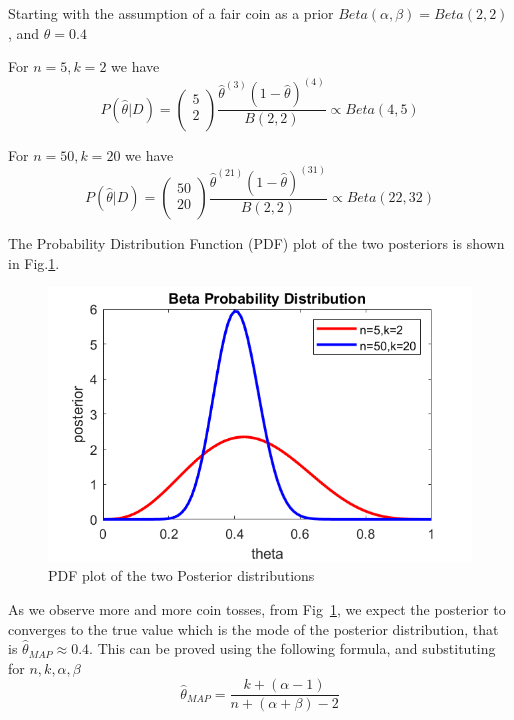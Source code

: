 \documentclass{article}
\begin{document}
\begin{enumerate}
\begin{enumerate}
{Starting with the assumption of a fair coin as a prior $Beta(\alpha, \beta) = Beta(2,2)$, and $\theta=0.4$

 For $n=5, k=2$ we have
\[
P(\hat{\theta}|D) =  \left(
                      \begin{array}{c}
                        5 \\
                        2 \\
                      \end{array}
                    \right)\frac{\hat{\theta}^{(3)}(1-\hat{\theta})^{(4)}}{B(2,2)} %
\propto Beta(4,5)
\]

 For $n=50, k=20$ we have
\[
P(\hat{\theta}|D) =   \left(
                      \begin{array}{c}
                        50 \\
                        20 \\
                      \end{array}
                    \right)\frac{\hat{\theta}^{(21)}(1-\hat{\theta})^{(31)}}{B(2,2)}  %
\propto Beta(22,32)
\]

The Probability Distribution Function (PDF) plot of the two posteriors is shown in Fig.\ref{betapdf_fig}.

\begin{figure}[!h]
  \centering
  \includegraphics[width=0.5\linewidth]{betapdfs.png}
  \caption{PDF plot of the two Posterior distributions}\label{betapdf_fig}
\end{figure}

As we observe more and more coin tosses, from Fig~\ref{betapdf_fig}, we expect the posterior to converges to the true value which is the mode of the posterior distribution, that is  $\hat{\theta}_{MAP} \approx 0.4$. This can be proved using the following formula, and substituting for $n,k, \alpha,\beta$
\[
\hat{\theta}_{MAP}= \frac{k +(\alpha-1)}{ n + (\alpha + \beta)-2}
\]

}
\end{enumerate}
\end{enumerate}
\end{document}

